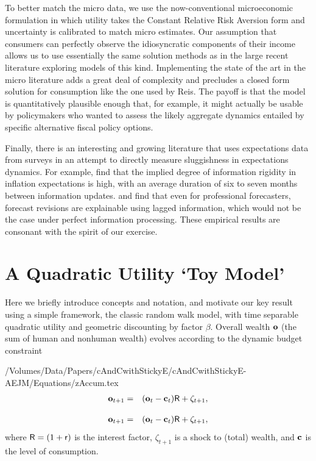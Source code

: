 \documentclass[titlepage]{./econtex}
\begin{document}
To better match the micro data, we use the now-conventional microeconomic formulation in which utility takes the Constant Relative Risk Aversion form and uncertainty is calibrated to match micro estimates.  Our assumption that consumers can perfectly observe the idiosyncratic components of their income allows us to use essentially the same solution methods as in the large recent literature exploring models of this kind.
Implementing the state of the art in the micro literature adds a great deal of complexity and precludes a closed form solution for consumption like the one used by Reis. The payoff is that the model is quantitatively plausible enough that, for example, it might actually be usable by policymakers who wanted to assess the likely aggregate dynamics entailed by specific alternative fiscal policy options.

Finally, there is an interesting and growing literature that uses expectations data from surveys in an attempt to directly measure sluggishness in expectations dynamics.
For example, \cite{coibGor:AER15} find that the implied degree of information rigidity in inflation expectations is high, with an average duration of six to seven months between information updates. \cite{fuhrer:JME17} and \cite{fuhrerIntrinsicPersistence} find that even for professional forecasters, forecast revisions are explainable using lagged information, which would not be the case under perfect information processing.  These empirical results are consonant with the spirit of our exercise.

\hypertarget{Quadratic}{}
\section{A Quadratic Utility `Toy Model'}\label{sec:Quadratic}

Here we briefly introduce concepts and notation, and motivate our key result using a simple framework, the classic \cite{hallRandomWalk} random walk model, with time separable quadratic utility and geometric discounting by factor $\beta$.  Overall wealth $\mathbf{o}$ (the sum of human and nonhuman wealth) evolves according to the dynamic budget constraint
\begin{verbatimwrite}{/Volumes/Data/Papers/cAndCwithStickyE/cAndCwithStickyE-AEJM/Equations/zAccum.tex}
\begin{eqnarray}
  \mathbf{o}_{t+1} & = & (\mathbf{o}_{t}-\mathbf{c}_{t})\mathsf{R}+\zeta_{t+1}, \label{eq:zAccum}
\end{eqnarray}
\end{verbatimwrite}
\begin{eqnarray}
  \mathbf{o}_{t+1} & = & (\mathbf{o}_{t}-\mathbf{c}_{t})\mathsf{R}+\zeta_{t+1}, \label{eq:zAccum}
\end{eqnarray}
 where $\mathsf{R}=(1+\mathsf{r})$ is the interest factor, $\zeta_{t+1}$ is a shock to (total) wealth, and $\mathbf{c}$ is the level of consumption.
\end{document}
